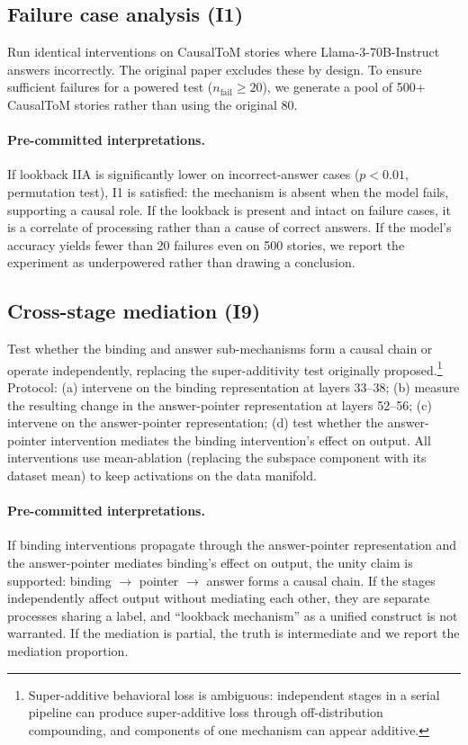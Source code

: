 \documentclass{article}
\begin{document}
\subsection{Failure case analysis (I1)}
\label{sec:failure}

Run identical interventions on CausalToM stories where Llama-3-70B-Instruct answers incorrectly. The original paper excludes these by design. To ensure sufficient failures for a powered test ($n_{\text{fail}} \geq 20$), we generate a pool of 500+ CausalToM stories rather than using the original 80.

\paragraph{Pre-committed interpretations.} If lookback IIA is significantly lower on incorrect-answer cases ($p < 0.01$, permutation test), I1 is satisfied: the mechanism is absent when the model fails, supporting a causal role. If the lookback is present and intact on failure cases, it is a correlate of processing rather than a cause of correct answers. If the model's accuracy yields fewer than 20 failures even on 500 stories, we report the experiment as underpowered rather than drawing a conclusion.

\subsection{Cross-stage mediation (I9)}
\label{sec:mediation}

Test whether the binding and answer sub-mechanisms form a causal chain or operate independently, replacing the super-additivity test originally proposed.\footnote{Super-additive behavioral loss is ambiguous: independent stages in a serial pipeline can produce super-additive loss through off-distribution compounding, and components of one mechanism can appear additive.} Protocol: (a) intervene on the binding representation at layers 33--38; (b) measure the resulting change in the answer-pointer representation at layers 52--56; (c) intervene on the answer-pointer representation; (d) test whether the answer-pointer intervention mediates the binding intervention's effect on output. All interventions use mean-ablation (replacing the subspace component with its dataset mean) to keep activations on the data manifold.

\paragraph{Pre-committed interpretations.} If binding interventions propagate through the answer-pointer representation and the answer-pointer mediates binding's effect on output, the unity claim is supported: binding $\to$ pointer $\to$ answer forms a causal chain. If the stages independently affect output without mediating each other, they are separate processes sharing a label, and ``lookback mechanism'' as a unified construct is not warranted. If the mediation is partial, the truth is intermediate and we report the mediation proportion.
\end{document}
